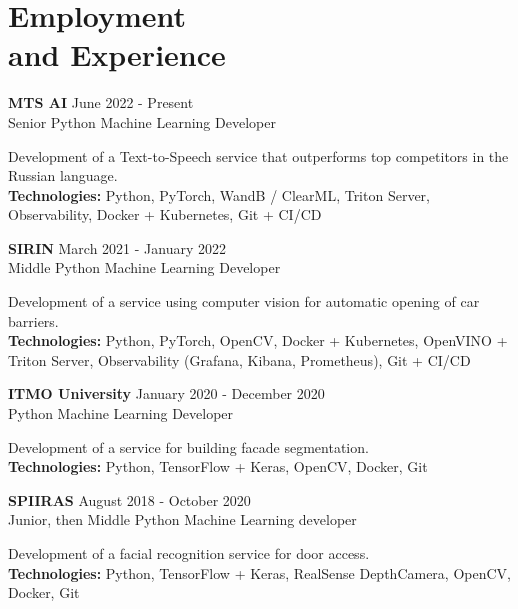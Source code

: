 \section{\sc Employment \\and Experience}
\vspace{2.6pt}

\textbf{MTS AI} \hfill June 2022 - Present \\
Senior Python Machine Learning Developer

Development of a Text-to-Speech service that outperforms top competitors in the Russian language. \\
\textbf{Technologies:} Python, PyTorch, WandB / ClearML, Triton Server, Observability, Docker + Kubernetes, Git + CI/CD

\textbf{SIRIN} \hfill March 2021 - January 2022 \\
Middle Python Machine Learning Developer

Development of a service using computer vision for automatic opening of car barriers. \\
\textbf{Technologies:} Python, PyTorch, OpenCV, Docker + Kubernetes, OpenVINO + Triton Server, Observability (Grafana, Kibana, Prometheus), Git + CI/CD

\textbf{ITMO University} \hfill January 2020 - December 2020 \\
Python Machine Learning Developer

Development of a service for building facade segmentation. \\
\textbf{Technologies:} Python, TensorFlow + Keras, OpenCV, Docker, Git

\textbf{SPIIRAS} \hfill August 2018 - October 2020 \\
Junior, then Middle Python Machine Learning developer

Development of a facial recognition service for door access. \\
\textbf{Technologies:} Python, TensorFlow + Keras, RealSense DepthCamera, OpenCV, Docker, Git

\endinput
